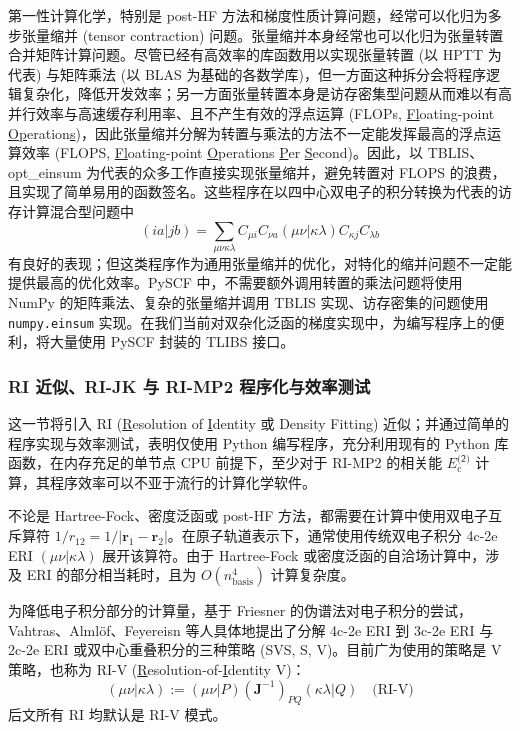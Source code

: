 第一性计算化学，特别是 post-HF 方法和梯度性质计算问题，经常可以化归为多步张量缩并 (tensor contraction) 问题。张量缩并本身经常也可以化归为张量转置合并矩阵计算问题。尽管已经有高效率的库函数用以实现张量转置 (以 HPTT 为代表) 与矩阵乘法 (以 BLAS 为基础的各数学库)，但一方面这种拆分会将程序逻辑复杂化，降低开发效率；另一方面张量转置本身是访存密集型问题从而难以有高并行效率与高速缓存利用率、且不产生有效的浮点运算 (FLOPs, \underline{Fl}oating-point \underline{Op}eration\underline{s})，因此张量缩并分解为转置与乘法的方法不一定能发挥最高的浮点运算效率 (FLOPS, \underline{Fl}oating-point \underline{O}perations \underline{P}er \underline{S}econd)。因此，以 TBLIS、opt\_einsum 为代表的众多工作直接实现张量缩并，避免转置对 FLOPS 的浪费，且实现了简单易用的函数签名。这些程序在以四中心双电子的积分转换为代表的访存计算混合型问题中
\begin{equation*}
  (ia|jb) = \sum_{\mu \nu \kappa \lambda} C_{\mu i} C_{\nu a} (\mu \nu | \kappa \lambda) C_{\kappa j} C_{\lambda b}
\end{equation*}
有良好的表现；但这类程序作为通用张量缩并的优化，对特化的缩并问题不一定能提供最高的优化效率。PySCF 中，不需要额外调用转置的乘法问题将使用 NumPy 的矩阵乘法、复杂的张量缩并调用 TBLIS 实现、访存密集的问题使用 \verb|numpy.einsum| 实现。在我们当前对双杂化泛函的梯度实现中，为编写程序上的便利，将大量使用 PySCF 封装的 TLIBS 接口。

\subsubsection{RI 近似、RI-JK 与 RI-MP2 程序化与效率测试}
\label{sec.rijk-rimp2-efficiency}

这一节将引入 RI (\underline{R}esolution of \underline{I}dentity 或 Density Fitting) 近似；并通过简单的程序实现与效率测试，表明仅使用 Python 编写程序，充分利用现有的 Python 库函数，在内存充足的单节点 CPU 前提下，至少对于 RI-MP2 的相关能 $E_\mathrm{c}^\textsf{(2)}$ 计算，其程序效率可以不亚于流行的计算化学软件。

不论是 Hartree-Fock、密度泛函或 post-HF 方法，都需要在计算中使用双电子互斥算符 $1 / r_{12} = 1 / |\bm{r}_1 - \bm{r}_2|$。在原子轨道表示下，通常使用传统双电子积分 4c-2e ERI $(\mu \nu | \kappa \lambda)$ 展开该算符。由于 Hartree-Fock 或密度泛函的自洽场计算中，涉及 ERI 的部分相当耗时，且为 $O(n_\mathrm{basis}^4)$ 计算复杂度。

为降低电子积分部分的计算量，基于 Friesner 的伪谱法对电子积分的尝试\cite{Friesner-Friesner.CPL.1985, Friesner-Friesner.JCP.1987}，Vahtras、Alml\"of、Feyereisn 等人具体地提出了分解 4c-2e ERI 到 3c-2e ERI 与 2c-2e ERI 或双中心重叠积分的三种策略 (SVS, S, V)\cite{Vahtras-Feyereisen.CPL.1993}。目前广为使用的策略是 V 策略，也称为 RI-V (\underline{R}esolution-of-\underline{I}dentity V)：
\begin{equation}
  (\mu \nu | \kappa \lambda) := (\mu \nu | P) (\mathbf{J}^{-1})_{PQ} (\kappa \lambda | Q) \quad \text{(RI-V)}
\end{equation}
后文所有 RI 均默认是 RI-V 模式。

